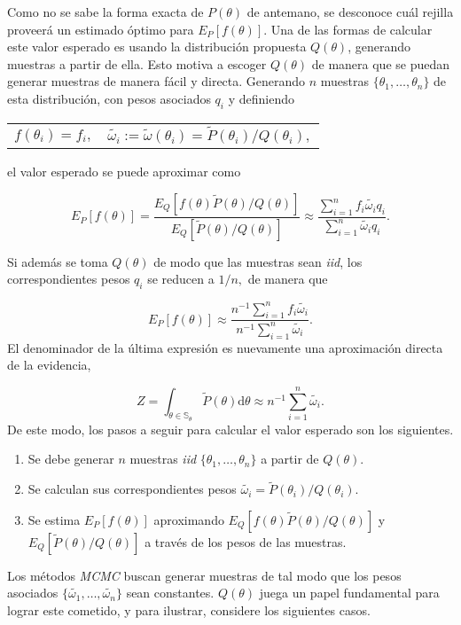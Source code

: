 	Como no se sabe la forma exacta de $P(\theta)$ de antemano, se desconoce cuál rejilla proveerá un estimado óptimo para $E_P[f(\theta)]$. Una de las formas de calcular este valor esperado es usando la distribución propuesta $Q(\theta)$, generando muestras a partir de ella. Esto motiva a escoger $Q(\theta)$ de manera que se puedan generar muestras de manera fácil y directa. Generando $n$ muestras $\{\theta_1,\dots,\theta_n\}$ de esta distribución, con pesos asociados $q_i$ y definiendo
	\begin{center}
	\begin{tabular}{cc}
	$f(\theta_i)=f_i,$& $\tilde{\omega_i}:=\tilde{\omega}(\theta_i)=\tilde{P}(\theta_i)/Q(\theta_i),$
	\end{tabular}
	\end{center}
	
	el valor esperado se puede aproximar como
	
	$$E_P[f(\theta)]=\frac{E_Q[f(\theta)\tilde{P}(\theta)/Q(\theta)]}{E_Q[\tilde{P}(\theta)/Q(\theta)]}\approx \frac{\sum_{i=1}^n f_i\tilde{\omega_i}q_i}{\sum_{i=1}^n \tilde{\omega_i}q_i}.$$
	
	Si además se toma $Q(\theta)$ de modo que las muestras sean \textit{iid}, los correspondientes pesos $q_i$ se reducen a $1/n,$ de manera que
	
	$$E_P[f(\theta)]\approx \frac{n^{-1}\sum_{i=1}^n f_i\tilde{\omega_i}}{n^{-1}\sum_{i=1}^n \tilde{\omega_i}}.$$
	El denominador de la última expresión es nuevamente una aproximación directa de la evidencia,
	
	$$Z=\int_{\theta\in\mathbb{S}_\theta} \tilde{P}(\theta)\mathrm{d}\theta\approx n^{-1}\sum_{i=1}^n \tilde{\omega_i}.$$
	De este modo, los pasos a seguir para calcular el valor esperado son los siguientes.
	\begin{enumerate}
		\item Se debe generar $n$ muestras \textit{iid} $\{\theta_1,\dots,\theta_n\}$ a partir de $Q(\theta)$.
		\item Se calculan sus correspondientes pesos $\tilde{\omega_i}=\tilde{P}(\theta_i)/Q(\theta_i).$
		\item Se estima $E_P[f(\theta)]$ aproximando $E_Q[f(\theta)\tilde{P}(\theta)/Q(\theta)]$ y $E_Q[\tilde{P}(\theta)/Q(\theta)]$ a través de los pesos de las muestras.
	\end{enumerate}
	Los métodos \textit{MCMC} buscan generar muestras de tal modo que los pesos asociados $\{\tilde{\omega_1},\dots, \tilde{\omega_n}\}$ sean constantes. $Q(\theta)$ juega un papel fundamental para lograr este cometido, y para ilustrar, considere los siguientes casos.
	
